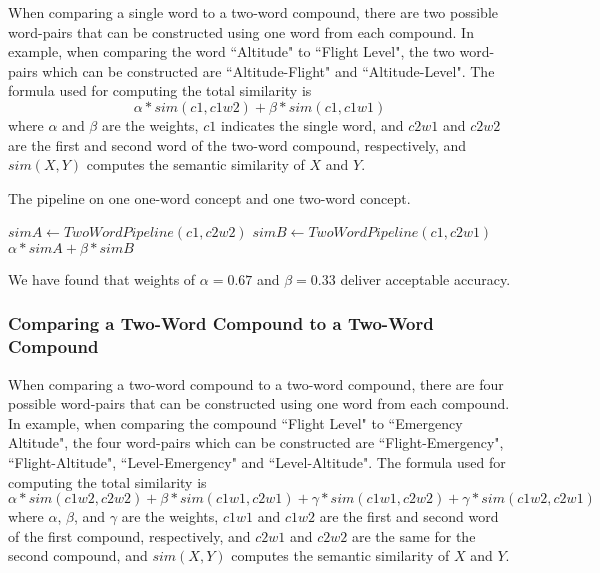 \documentclass{article}
\begin{document}
When comparing a single word to a two-word compound, there are two possible word-pairs that can be constructed using one word from each compound. In example, when comparing the word ``Altitude" to ``Flight Level", the two word-pairs which can be constructed are ``Altitude-Flight" and ``Altitude-Level".
The formula used for computing the total similarity is 
\begin{equation} \label{eq:1wordto2word}
	\alpha * sim(c1, c1w2) + \beta * sim(c1, c1w1)
\end{equation}
where $\alpha$ and $\beta$ are the weights, $c1$ indicates the single word, and $c2w1$ and $c2w2$ are the first and second word of the two-word compound, respectively, and $sim(X,Y)$ computes the semantic similarity of $X$ and $Y$. %

\begin{algorithm}
\caption{The pipeline on one one-word concept and one two-word concept.}\label{al:onetwocompoundpipeline}
\begin{algorithmic}[1]
		\State $\textit{simA} \gets \textit{TwoWordPipeline}(c1, c2w2)$
		\State $\textit{simB} \gets \textit{TwoWordPipeline}(c1, c2w1)$
		\State \Return $\alpha * \textit{simA} + \beta * \textit{simB}$
	\EndProcedure
\end{algorithmic}
\end{algorithm}

We have found that weights of $\alpha = 0.67$ and $\beta = 0.33$ deliver acceptable accuracy. %

\subsubsection{Comparing a Two-Word Compound to a Two-Word Compound}

When comparing a two-word compound to a two-word compound, there are four possible word-pairs that can be constructed using one word from each compound. In example, when comparing the compound ``Flight Level" to ``Emergency Altitude", the four word-pairs which can be constructed are ``Flight-Emergency", ``Flight-Altitude", ``Level-Emergency" and ``Level-Altitude".
The formula used for computing the total similarity is 
\begin{equation} \label{eq:2wordto2word}
	\alpha * sim(c1w2, c2w2) + \beta * sim(c1w1, c2w1) + \gamma * sim(c1w1, c2w2) + \gamma * sim(c1w2, c2w1)
\end{equation}
where $\alpha$, $\beta$, and $\gamma$ are the weights, $c1w1$ and $c1w2$ are the first and second word of the first compound, respectively, and $c2w1$ and $c2w2$ are the same for the second compound, and $sim(X,Y)$ computes the semantic similarity of $X$ and $Y$. 
\end{document}
